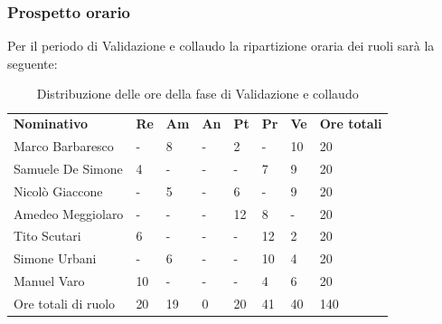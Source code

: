 \subsubsection{Prospetto orario}
Per il periodo di Validazione e collaudo la ripartizione oraria dei ruoli sarà la seguente:
\begin{center}
    \begin{table}[ht!]
        \centering
        \caption{Distribuzione delle ore della fase di Validazione e collaudo}
        \vspace{5px}
        \renewcommand{\arraystretch}{1.8}
        \begin{tabular}{p{100px} p{20px} p{20px} p{20px} p{20px} p{20px} p{20px} p{50px} }
            \rowcolor{logo!70} \textbf{Nominativo} & \textbf{Re} & \textbf{Am} & \textbf{An} & \textbf{Pt} & \textbf{Pr} & \textbf{Ve} & \textbf{Ore totali} \\
            Marco Barbaresco                       & -           & 8           & -           & 2           & -           & 10          & 20                  \\
            Samuele De Simone                      & 4           & -           & -           & -           & 7           & 9           & 20                  \\
            Nicolò Giaccone                        & -           & 5           & -           & 6           & -           & 9           & 20                  \\
            Amedeo Meggiolaro                      & -           & -           & -           & 12          & 8           & -           & 20                  \\
            Tito Scutari                           & 6           & -           & -           & -           & 12          & 2           & 20                  \\
            Simone Urbani                          & -           & 6           & -           & -           & 10          & 4           & 20                  \\
            Manuel Varo                            & 10          & -           & -           & -           & 4           & 6           & 20                  \\
            Ore totali di ruolo                    & 20          & 19          & 0           & 20          & 41          & 40          & 140                 \\
        \end{tabular}
    \end{table}
\end{center}
\pagebreak

